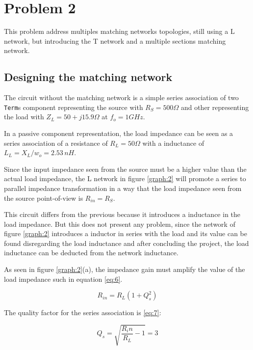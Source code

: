 \section{Problem 2}

This problem address multiples matching networks topologies, still using a L network, but introducing the T network and a multiple sections matching network.

\subsection{Designing the matching network}

The circuit without the matching network is a simple series association of two \texttt{Term}s component representing the source with $R_S = 500 \Omega$ and other representing the load with $Z_L = 50 + j15.9 \Omega$ at $f_o = 1 GHz$.

In a passive component representation, the load impedance can be seen as a series association of a resistance of $R_L = 50 \Omega$ with a inductance of $L_L = X_L/w_o = 2.53 \, nH$. 

Since the input impedance seen from the source must be a higher value than the actual load impedance, the L network in figure \ref{graph:2} will promote a series to parallel impedance transformation in a way that the load impedance seen from the source point-of-view is $R_{in} = R_S$.



This circuit differs from the previous because it introduces a inductance in the load impedance. But this does not present any problem, since the network of figure \ref{graph:2} introduces a inductor in series with the load and its value can be found disregarding  the load inductance and after concluding the project, the load inductance can be deducted from the network inductance.

As seen in figure \ref{graph:2}(a), the impedance gain must amplify the value of the load impedance such in equation \ref{eq:6}.

\begin{equation} \label{eq:6}
    R_{in} = R_L(1+Q_s^2)
\end{equation}

The quality factor for the series association is \ref{eq:7}:

\begin{equation} \label{eq:7}
    Q_s = \sqrt{\frac{R_in}{R_{L}}-1} = 3
\end{equation}


